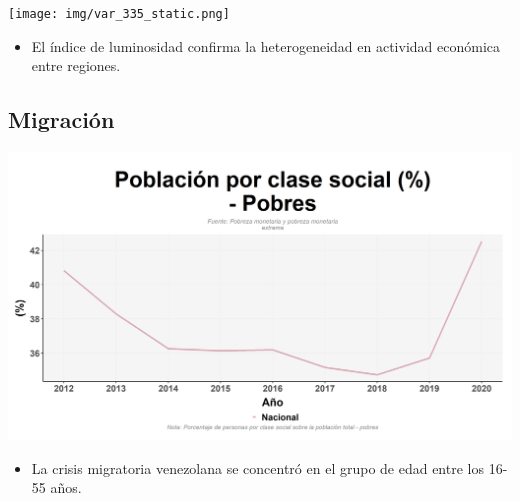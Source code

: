 \documentclass[aspectratio=169]{beamer}
\begin{document}
    
    \begin{slide}{8} 
            \begin{imagecolumn}
                \texttt{[image: img/var\_335\_static.png]}
            \end{imagecolumn}
            \begin{textcolumn}
                \begin{itemize}
                    \item El índice de luminosidad confirma la heterogeneidad en actividad económica entre regiones.
                \end{itemize}
            \end{textcolumn}

    \printcolumns
    \end{slide}
    
    
    \subsection{Migración}
    
    \begin{slide}{10} 
                      \begin{imagecolumn}
                \includegraphics[width=\columnwidth]{img/var_272_trend.png}
            \end{imagecolumn}
            \begin{textcolumn}
                \begin{itemize}
                    \item La crisis migratoria venezolana se concentró en el grupo de edad entre los 16-55 años.
                \end{itemize}
            \end{textcolumn}

    \printcolumns
    \end{slide}
    
\end{document}
